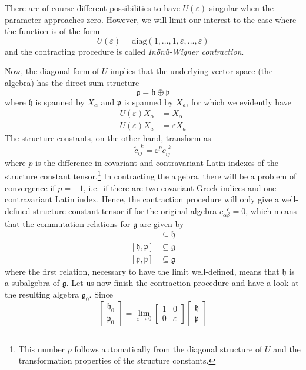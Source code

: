 \documentclass[10pt]{article}
\newcommand{\mfrak}{\mathfrak}
\newcommand{\mrm}{\mathrm}
\begin{document}
There are of course different possibilities to have $U(\varepsilon)$ singular 
when the parameter approaches zero. However, we will limit our interest to the 
case where the function is of the form
\begin{equation}
  U(\varepsilon) = \mrm{diag}(1,\dots,1,\varepsilon,\dots,\varepsilon)
\end{equation}
and the contracting procedure is called \emph{In\"on\"u-Wigner contraction}.

Now, the diagonal form of $U$ implies that the underlying vector space (the 
algebra) has the direct sum structure
\begin{equation}
  \mfrak{g} = \mfrak{h} \oplus \mfrak{p}
\end{equation}
where $\mfrak{h}$ is spanned by $X_\alpha$ and $\mfrak{p}$ is spanned by $X_a$, 
for which we evidently have
\begin{align*}
  U(\varepsilon)X_\alpha &= X_\alpha \\
  U(\varepsilon)X_a &= \varepsilon X_a
\end{align*}
The structure constants, on the other hand, transform as
\begin{equation}
  \tilde{c}_{ij}^{~ ~k} = \varepsilon^p c_{ij}^{~ ~k}
\end{equation}
where $p$ is the difference in covariant and contravariant Latin indexes of the 
structure constant tensor.\footnote{This number $p$ follows automatically from 
the diagonal structure of $U$ and the transformation properties of the structure 
constants.} In contracting the algebra, there will be a problem of convergence 
if $p=-1$, i.e.~if there are two covariant Greek indices and one contravariant 
Latin index. Hence, the contraction procedure will only give a well-defined 
structure constant tensor if for the original algebra $c_{\alpha\beta}^{~ ~ 
~c}=0$, which means that the commutation relations for $\mfrak{g}$ are given by
\begin{align}
  [\mfrak{h},\mfrak{h}] &\subseteq \mfrak{h} \\
  [\mfrak{h},\mfrak{p}] &\subseteq \mfrak{g} \\
  [\mfrak{p},\mfrak{p}] &\subseteq \mfrak{g}
\end{align}
where the first relation, necessary to have the limit well-defined, means that 
$\mfrak{h}$ is a subalgebra of $\mfrak{g}$. Let us now finish the contraction 
procedure and have a look at the resulting algebra $\mfrak{g}_0$. Since
\begin{equation}
  \begin{bmatrix}
    \mfrak{h}_0 \\
    \mfrak{p}_0
  \end{bmatrix} =
  \lim_{\varepsilon \rightarrow 0}
  \begin{bmatrix}
    1 & 0 \\
    0 & \varepsilon
  \end{bmatrix}
  \begin{bmatrix}
    \mfrak{h} \\
    \mfrak{p}
  \end{bmatrix}
\end{equation}
\end{document}

